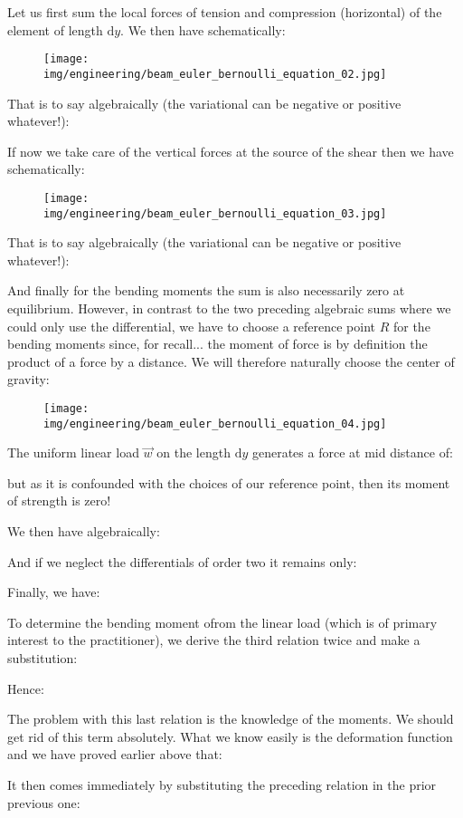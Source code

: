 	Let us first sum the local forces of tension and compression (horizontal) of the element of length $\mathrm{d}y$. We then have schematically:
	\begin{figure}[H]
		\centering
		\texttt{[image: img/engineering/beam\_euler\_bernoulli\_equation\_02.jpg]}
	\end{figure}
	That is to say algebraically (the variational can be negative or positive whatever!):
	
	If now we take care of the vertical forces at the source of the shear then we have schematically:
	\begin{figure}[H]
		\centering
		\texttt{[image: img/engineering/beam\_euler\_bernoulli\_equation\_03.jpg]}
	\end{figure}
	That is to say algebraically (the variational can be negative or positive whatever!):
	
	And finally for the bending moments the sum is also necessarily zero at equilibrium. However, in contrast to the two preceding algebraic sums where we could only use the differential, we have to choose a reference point $R$ for the bending moments since, for recall... the moment of force is by definition the product of a force by a distance. We will therefore naturally choose the center of gravity:
	\begin{figure}[H]
		\centering
		\texttt{[image: img/engineering/beam\_euler\_bernoulli\_equation\_04.jpg]}
	\end{figure}
	The uniform linear load $\vec{w}$ on the length $\mathrm{d}y$ generates a force at mid distance of:
	
	but as it is confounded with the choices of our reference point, then its moment of strength is zero!

	We then have algebraically:
	
	And if we neglect the differentials of order two it remains only:
	
	Finally, we have:
	
	To determine the bending moment ofrom the linear load (which is of primary interest to the practitioner), we derive the third relation twice and make a substitution:
	
	Hence:
	
	The problem with this last relation is the knowledge of the moments. We should get rid of this term absolutely. What we know easily is the deformation function and we have proved earlier above that:
	
	It then comes immediately by substituting the preceding relation in the prior previous one:
	
